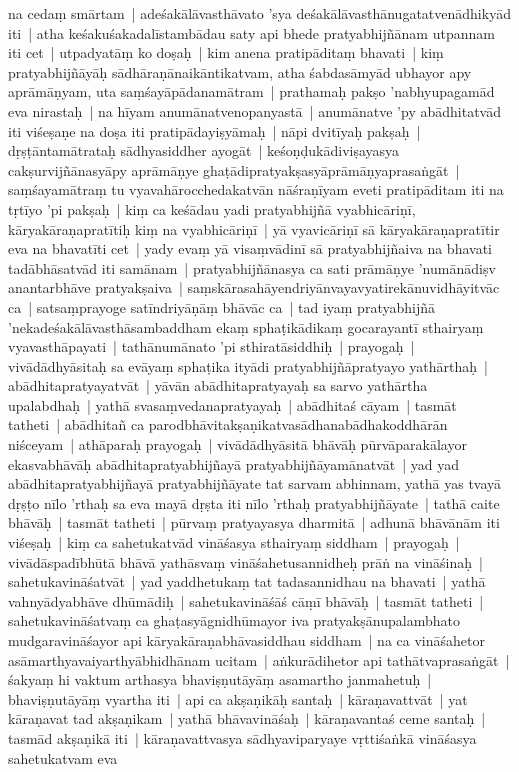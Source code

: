 \documentclass[article,12pt,a4paper]{memoir}
\begin{document}
\label{thakur75-114.13} na cedaṃ smārtam | adeśakālāvasthāvato 'sya deśakālāvasthānugatatvenādhikyād iti | \label{thakur75-114.15} atha keśakuśakadalīstambādau saty api bhede pratyabhijñānam utpannam iti cet | utpadyatāṃ ko doṣaḥ | kim anena pratipāditaṃ bhavati | kiṃ pratyabhijñāyāḥ sādhāraṇānaikāntikatvam, atha śabdasāmyād ubhayor apy aprāmāṇyam, uta saṃśayāpādanamātram | \label{thakur75-114.18} prathamaḥ pakṣo 'nabhyupagamād eva nirastaḥ | na hīyam anumānatvenopanyastā | anumānatve 'py abādhitatvād iti viśeṣaṇe na doṣa iti pratipādayiṣyāmaḥ | \label{thakur75-114.19} nāpi dvitīyaḥ pakṣaḥ | dṛṣṭāntamātrataḥ sādhyasiddher ayogāt | keśoṇḍukādiviṣayasya cakṣurvijñānasyāpy aprāmāṇye ghaṭādipratyakṣasyāprāmāṇyaprasaṅgāt | \label{thakur75-114.21} saṃśayamātraṃ tu vyavahārocchedakatvān nāśraṇīyam eveti pratipāditam iti na tṛtīyo 'pi pakṣaḥ | \label{thakur75-114.23} kiṃ ca keśādau yadi pratyabhijñā vyabhicāriṇī, kāryakāraṇapratītiḥ kiṃ na vyabhicāriṇī | yā vyavicāriṇī sā kāryakāraṇapratītir eva na bhavatīti cet | yady evaṃ yā visaṃvādinī sā pratyabhijñaiva na bhavati tadābhāsatvād iti samānam | pratyabhijñānasya ca sati prāmāṇye 'numānādiṣv anantarbhāve pratyakṣaiva | saṃskārasahāyendriyānvayavyatirekānuvidhāyitvāc ca | satsaṃprayoge satīndriyāṇāṃ bhāvāc ca | tad iyaṃ pratyabhijñā 'nekadeśakālāvasthāsambaddham ekaṃ sphaṭikādikaṃ gocarayantī sthairyaṃ vyavasthāpayati | \label{thakur75-114.30} tathānumānato 'pi sthiratāsiddhiḥ | prayogaḥ | vivādādhyāsitaḥ sa evāyaṃ sphaṭika ityādi pratyabhijñāpratyayo yathārthaḥ | abādhitapratyayatvāt | yāvān abādhitapratyayaḥ sa sarvo yathārtha upalabdhaḥ | yathā svasaṃvedanapratyayaḥ | abādhitaś cāyam | tasmāt tatheti | abādhitañ ca parodbhāvitakṣaṇikatvasādhanabādhakoddhārān niśceyam | \label{thakur75-115.1} athāparaḥ prayogaḥ | vivādādhyāsitā bhāvāḥ pūrvāparakālayor ekasvabhāvāḥ abādhitapratyabhijñayā pratyabhijñāyamānatvāt | yad yad abādhitapratyabhijñayā pratyabhijñāyate tat sarvam abhinnam, yathā yas tvayā dṛṣṭo nīlo 'rthaḥ sa eva mayā dṛṣta iti nīlo 'rthaḥ pratyabhijñāyate | tathā caite bhāvāḥ | tasmāt tatheti | pūrvaṃ pratyayasya dharmitā | adhunā bhāvānām iti viśeṣaḥ | \label{thakur75-115.6} kiṃ ca sahetukatvād vināśasya sthairyaṃ siddham | prayogaḥ | vivādāspadībhūtā bhāvā yathāsvaṃ vināśahetusannidheḥ prāṅ na vināśinaḥ | sahetukavināśatvāt | yad yaddhetukaṃ tat tadasannidhau na bhavati | yathā vahnyādyabhāve dhūmādiḥ | sahetukavināśāś cāṃī bhāvāḥ | tasmāt tatheti | \label{thakur75-115.9}sahetukavināśatvaṃ ca ghaṭasyāgnidhūmayor iva pratyakṣānupalambhato mudgaravināśayor api kāryakāraṇabhāvasiddhau siddham | na ca vināśahetor asāmarthyavaiyarthyābhidhānam ucitam | aṅkurādihetor api tathātvaprasaṅgāt | śakyaṃ hi vaktum arthasya bhaviṣṇutāyāṃ asamartho janmahetuḥ | bhaviṣṇutāyāṃ vyartha iti | \label{thakur75-115.13} api ca akṣaṇikāḥ santaḥ | kāraṇavattvāt | yat kāraṇavat tad akṣaṇikam | yathā bhāvavināśaḥ | kāraṇavantaś ceme santaḥ | tasmād akṣaṇikā iti | \label{thakur75-115.15} kāraṇavattvasya sādhyaviparyaye vṛttiśaṅkā vināśasya sahetukatvam eva 
\end{document}
